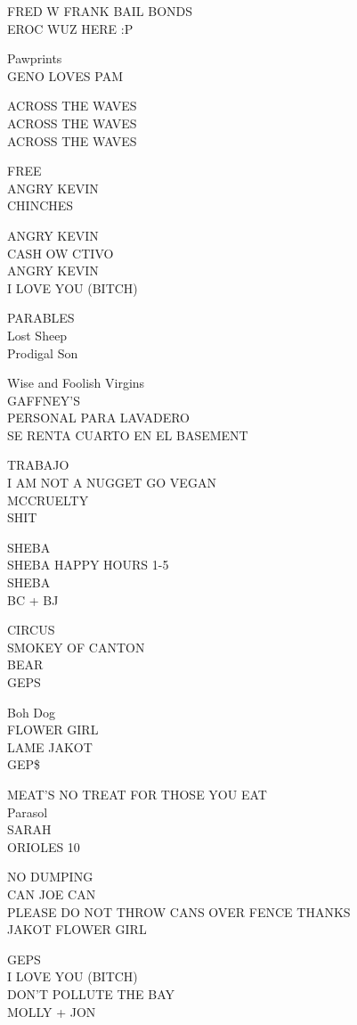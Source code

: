 \documentclass[10pt,letterpaper]{article}
\begin{document}
FRED W FRANK BAIL BONDS\\
EROC WUZ HERE :P

Pawprints\\
GENO LOVES PAM

ACROSS THE WAVES\\
ACROSS THE WAVES\\
ACROSS THE WAVES

FREE\\
ANGRY KEVIN\\
CHINCHES

ANGRY KEVIN\\
CASH OW CTIVO\\
ANGRY KEVIN\\
I LOVE YOU (BITCH)

PARABLES\\
Lost Sheep\\
Prodigal Son

Wise and Foolish Virgins\\
GAFFNEY'S\\
PERSONAL PARA LAVADERO\\
SE RENTA CUARTO EN EL BASEMENT

TRABAJO\\
I AM NOT A NUGGET GO VEGAN\\
MCCRUELTY\\
SHIT

SHEBA\\
SHEBA HAPPY HOURS 1{-}5\\
SHEBA\\
BC + BJ

CIRCUS\\
SMOKEY OF CANTON\\
BEAR\\
GEPS

Boh Dog\\
FLOWER GIRL\\
LAME JAKOT\\
GEP\$

MEAT'S NO TREAT FOR THOSE YOU EAT\\
Parasol\\
SARAH\\
ORIOLES 10

NO DUMPING\\
CAN JOE CAN\\
PLEASE DO NOT THROW CANS OVER FENCE THANKS\\
JAKOT FLOWER GIRL

GEPS\\
I LOVE YOU (BITCH)\\
DON'T POLLUTE THE BAY\\
MOLLY + JON
\end{document}
